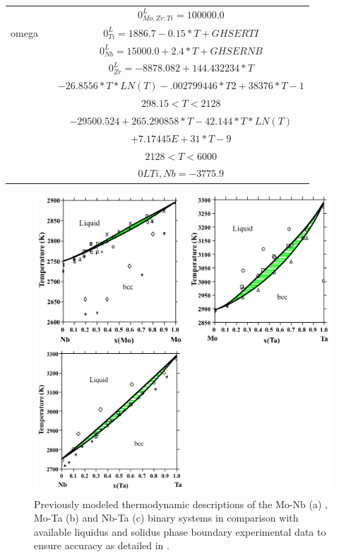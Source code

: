 \begin{longtable}[H]{ c c c }
                               & \cite{Kar2008} & $0^\textit{L}_{Mo,Zr:Ti} = 100000.0$\\
                  omega & \cite{Zhang2001} & $0^\textit{L}_{Ti} = 1886.7-0.15*T+GHSERTI$\\
                               & \cite{Zhang2001} &$0^\textit{L}_{Nb} = 15000.0+2.4*T+GHSERNB$\\
                               & \cite{Dinsdale1991} & $0^\textit{L}_{Zr} = -8878.082+144.432234*T$\\
                               &                               & $-26.8556*T*LN(T)-.002799446*T2+38376*T-1$\\                      
                               &      & $298.15 < T < 2128$\\
                               &      & $-29500.524+265.290858*T-42.144*T*LN(T)$\\
                               &      & $+7.17445E+31*T-9$\\          
                               &      &  $2128 < T< 6000$\\
                               & \cite{Zhang2001} & $0LTi,Nb = -3775.9$\\
		\hline
\end{longtable}



\newpage
\begin{figure}[H]
	\centering
	\includegraphics[width=\textwidth]{Chapter-3/Figures/binary1.png}
	\caption{Previously modeled thermodynamic descriptions of the Mo-Nb (a) \cite{Xiong2004}, Mo-Ta (b) \cite{Xiong2004} and Nb-Ta (c) \cite{Xiong2004} binary systems in comparison with available liquidus and solidus phase boundary experimental data to ensure accuracy as detailed in \cite{Xiong2004}. }
	\label{Ch3-figure:binary1}
\end{figure}

